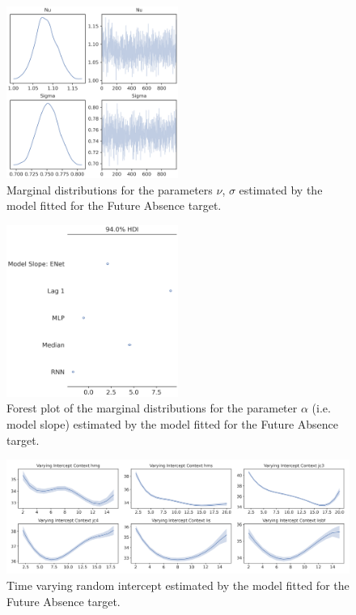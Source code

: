 \begin{figure}[H]
\centering
\includegraphics[width=0.5\textwidth]{images/appendix_C/collapsed_marginals_2.png}
\caption[\textbf{Targets collapsed marginal distributions}]{Marginal distributions for the parameters $\nu$, $\sigma$ estimated by the model fitted for the Future Absence target.}
\label{marginals_coll_2}
\end{figure}

\begin{figure}[H]
\centering
\includegraphics[width=0.5\textwidth]{images/appendix_C/collapsed_models_2.png}
\caption[\textbf{Targets collapsed model fixed effect}]{Forest plot of the marginal distributions for the parameter $\alpha$ (i.e. model slope) estimated by the model fitted for the Future Absence target.}
\label{model_coll_2}
\end{figure}

\begin{figure}[H]
\centering
\includegraphics[width=\textwidth]{images/appendix_C/collapsed_interc_2.png}
\caption[\textbf{Targets collapsed time-varying random intercept}]{Time varying random intercept estimated by the model fitted for the Future Absence target.}
\label{interc_coll_2}
\end{figure}


